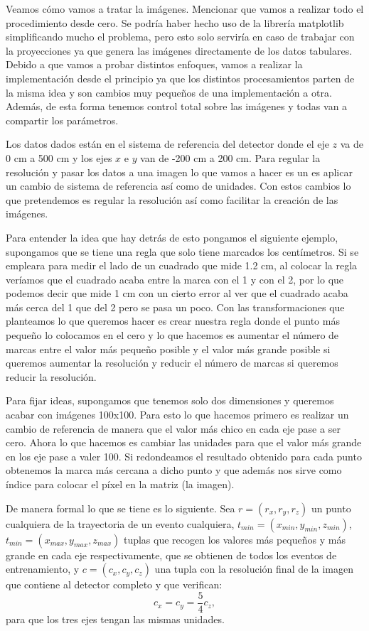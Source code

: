\documentclass[a4paper,12pt,twoside,titlepage]{article}
\begin{document}
Veamos cómo vamos a tratar la imágenes. Mencionar que vamos a realizar todo el procedimiento desde cero. Se podría haber hecho uso de la librería matplotlib simplificando mucho el problema, pero esto solo serviría en caso de trabajar con la proyecciones ya que genera las imágenes directamente de los datos tabulares. Debido a que vamos a probar distintos enfoques, vamos a realizar la implementación desde el principio ya que los distintos procesamientos parten de la misma idea y son cambios muy pequeños de una implementación a otra. Además, de esta forma tenemos control total sobre las imágenes y todas van a compartir los parámetros.

Los datos dados están en el sistema de referencia del detector donde el eje $z$ va de 0 cm a 500 cm y los ejes $x$ e $y$ van de -200 cm a 200 cm. Para regular la resolución y pasar los datos a una imagen lo que vamos a hacer es un es aplicar un cambio de sistema de referencia así como de unidades. Con estos cambios lo que pretendemos es regular la resolución así como facilitar la creación de las imágenes.

Para entender la idea que hay detrás de esto pongamos el siguiente ejemplo, supongamos que se tiene una regla que solo tiene marcados los centímetros. Si se empleara para medir el lado de un cuadrado que mide 1.2 \si[]{cm}, al colocar la regla veríamos que el cuadrado acaba entre la marca con el 1 y con el 2, por lo que podemos decir que mide 1 \si[]{cm} con un cierto error al ver que el cuadrado acaba más cerca del 1 que del 2 pero se pasa un poco. Con las transformaciones que planteamos lo que queremos hacer es crear nuestra regla donde el punto más pequeño lo colocamos en el cero y lo que hacemos es aumentar el número de marcas entre el valor más pequeño posible y el valor más grande posible si queremos aumentar la resolución y reducir el número de marcas si queremos reducir la resolución.

Para fijar ideas, supongamos que tenemos solo dos dimensiones y queremos acabar con imágenes 100x100. Para esto lo que hacemos primero es realizar un cambio de referencia de manera que el valor más chico en cada eje pase a ser cero. Ahora lo que hacemos es cambiar las unidades para que el valor más grande en los eje pase a valer 100. Si redondeamos el resultado obtenido para cada punto obtenemos la marca más cercana a dicho punto y que además nos sirve como índice para colocar el píxel en la matriz (la imagen).

De manera formal lo que se tiene es lo siguiente. Sea ${r} = (r_x, r_y, r_z)$ un punto cualquiera de la trayectoria de un evento cualquiera, $t_{min} = (x_{min}, y_{min}, z_{min})$, $t_{min} = (x_{max}, y_{max}, z_{max})$ tuplas que recogen los valores más pequeños y más grande en cada eje respectivamente, que se obtienen de todos los eventos de entrenamiento, y $c = (c_x, c_y, c_z)$ una tupla con la resolución final de la imagen que contiene al detector completo y que verifican:
\begin{equation}
  c_x = c_y = \frac{5}{4}c_z,
\end{equation}
para que los tres ejes tengan las mismas unidades.
\end{document}
